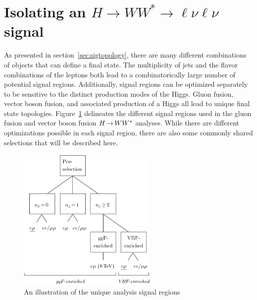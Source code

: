 


\section{Isolating an $H\rightarrow WW^{*}\rightarrow \ell\nu\ell\nu$ signal}

As presented in section~\ref{sec:sigtopology}, there are many different combinations of objects that can define a \HWWfull final state. The multiplicity of jets and the flavor combinations of the leptons both lead to a combinatorically large number of potential signal regions. Additionally, signal regions can be optimized separately to be sensitive to the distinct production modes of the Higgs. Gluon fusion, vector boson fusion, and associated production of a Higgs all lead to unique final state topologies. Figure~\ref{fig:analysisregions} delineates the different signal regions used in the gluon fusion and vector boson fusion $H{\,{\rightarrow}\,}WW^\ast$ analyses. While there are different optimizations possible in each signal region, there are also some commonly shared selections that will be described here.

\begin{figure}[h!]
  \centering
  \captionsetup{justification=centering}

  \includegraphics[width=0.6\textwidth]{figures/analysis_regions}
  \caption{An illustration of the unique analysis signal regions\cite{WW2015}}
  \label{fig:analysisregions}
\end{figure}

